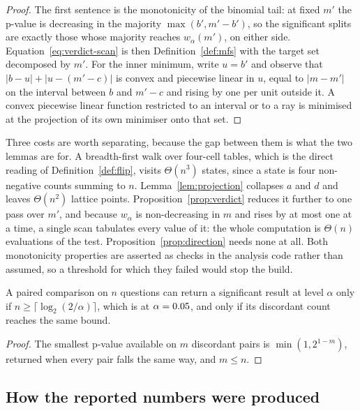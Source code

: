 \begin{proof}
The first sentence is the monotonicity of the binomial tail: at fixed $m'$ the
p-value is decreasing in the majority $\max(b', m' - b')$, so the significant
splits are exactly those whose majority reaches $w_\alpha(m')$, on either side.
Equation~\eqref{eq:verdict-scan} is then Definition~\ref{def:mfs} with the
target set decomposed by $m'$. For the inner minimum, write $u = b'$ and observe
that $|b - u| + |u - (m' - c)|$ is convex and piecewise linear in $u$, equal to
$|m - m'|$ on the interval between $b$ and $m' - c$ and rising by one per unit
outside it. A convex piecewise linear function restricted to an interval or to a
ray is minimised at the projection of its own minimiser onto that set.
\end{proof}

Three costs are worth separating, because the gap between them is what the two
lemmas are for. A breadth-first walk over four-cell tables, which is the direct
reading of Definition~\ref{def:flip}, visits $\Theta(n^3)$ states, since a state
is four non-negative counts summing to $n$. Lemma~\ref{lem:projection} collapses
$a$ and $d$ and leaves $\Theta(n^2)$ lattice points.
Proposition~\ref{prop:verdict} reduces it further to one pass over $m'$, and
because $w_\alpha$ is non-decreasing in $m$ and rises by at most one at a time,
a single scan tabulates every value of it: the whole computation is $\Theta(n)$
evaluations of the test. Proposition~\ref{prop:direction} needs none at all.
Both monotonicity properties are asserted as checks in the analysis code rather
than assumed, so a threshold for which they failed would stop the build.

\begin{corollary}\label{cor:floor}
A paired comparison on $n$ questions can return a significant result at level
$\alpha$ only if $n \geq \lceil \log_2 (2/\alpha) \rceil$, which is
\SignificanceNeedsM{} at $\alpha = 0.05{}$, and only if its discordant
count reaches the same bound.
\end{corollary}

\begin{proof}
The smallest p-value available on $m$ discordant pairs is $\min(1, 2^{1-m})$,
returned when every pair falls the same way, and $m \leq n$.
\end{proof}

\subsection{How the reported numbers were produced}

